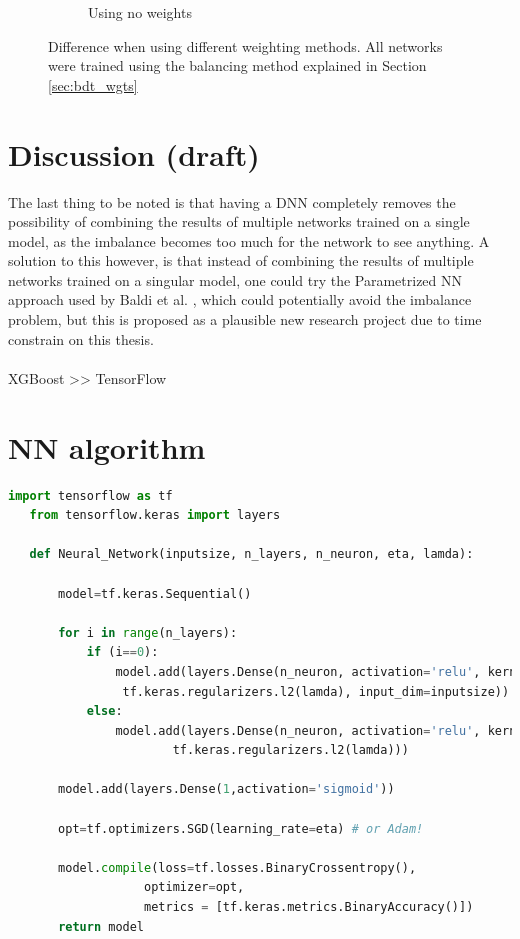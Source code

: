 \documentclass[12pt, a4paper]{book}
\begin{document}
\begin{figure}[!ht]
\begin{subfigure}[b]{0.49\textwidth}
      \caption{Using no weights}
   \end{subfigure}
   \caption[Difference when using different weighting methods on BDTs]{Difference when using different weighting methods. All networks were trained using the balancing method explained in Section \ref{sec:bdt_wgts}}\label{fig:BDT_wgts_sig}
\end{figure}

\clearpage\section{Discussion (draft)}
The last thing to be noted is that having a DNN completely removes the possibility of combining the results of multiple networks trained on a single model, as the imbalance becomes too much for the network to see anything.
A solution to this however, is that instead of combining the results of multiple networks trained on a singular model, one could try the Parametrized NN approach used by Baldi et al. \cite{Baldi_2016}, which could potentially avoid the imbalance problem, but this is 
proposed as a plausible new research project due to time constrain on this thesis.\\
\\ XGBoost >> TensorFlow


\clearpage
\section{NN algorithm}
\begin{lstlisting}[language=Python, caption={Neural network definition using TensorFlow}, label=alg:nn, captionpos=t]
   import tensorflow as tf
   from tensorflow.keras import layers
   
   def Neural_Network(inputsize, n_layers, n_neuron, eta, lamda):
       
       model=tf.keras.Sequential()      
       
       for i in range(n_layers):       
           if (i==0):                  
               model.add(layers.Dense(n_neuron, activation='relu', kernel_regularizer=
                tf.keras.regularizers.l2(lamda), input_dim=inputsize))
           else:                       
               model.add(layers.Dense(n_neuron, activation='relu', kernel_regularizer=
                       tf.keras.regularizers.l2(lamda)))
                       
       model.add(layers.Dense(1,activation='sigmoid')) 
       
       opt=tf.optimizers.SGD(learning_rate=eta) # or Adam!
       
       model.compile(loss=tf.losses.BinaryCrossentropy(),
                   optimizer=opt,
                   metrics = [tf.keras.metrics.BinaryAccuracy()])
       return model
\end{lstlisting}
\end{document}
